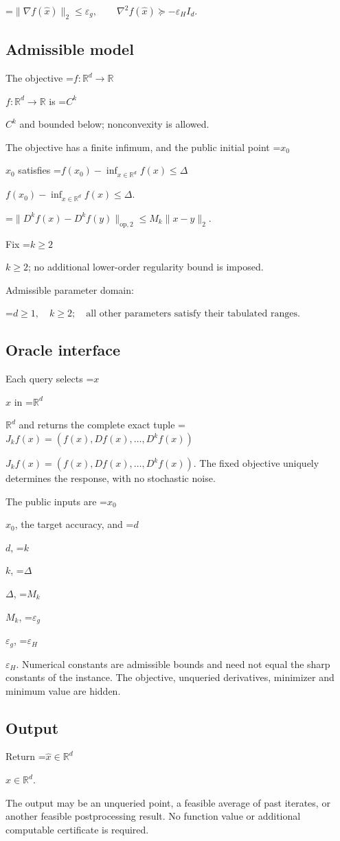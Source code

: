 \documentclass[10pt,a4paper]{article}
\newcommand{\AtlasMath}[1]{\par\begingroup\centering\setbox0=\hbox{$\displaystyle #1$}\ifdim\wd0>1.4\linewidth\typeout{ATLAS WIDE FORMULA: \the\wd0}\fi\ifdim\wd0>\linewidth\resizebox{\linewidth}{!}{\box0}\else\box0\fi\par\endgroup}
\newcommand{\AtlasInlineMath}[1]{\begingroup\setbox0=\hbox{$#1$}\ifdim\wd0>.4\linewidth\endgroup\AtlasMath{#1}\else\endgroup$#1$\fi}
\begin{document}
\AtlasMath{\|\nabla f(\widehat{x})\|_2\le\varepsilon_g,\qquad\nabla^2f(\widehat{x})\succeq-\varepsilon_H I_d.}


\subsection{Admissible model}
The objective \AtlasInlineMath{f:\mathbb{R}^d\to\mathbb{R}} is \AtlasInlineMath{C^k} and bounded below; nonconvexity is allowed.

The objective has a finite infimum, and the public initial point \AtlasInlineMath{x_0} satisfies \AtlasInlineMath{f(x_0)-\inf_{x\in \mathbb{R}^d}f(x)\le\Delta}.


\AtlasMath{\|D^{k}f(x)-D^{k}f(y)\|_{\mathrm{op},2}\le M_k\|x-y\|_{2}.}


Fix \AtlasInlineMath{k\ge2}; no additional lower-order regularity bound is imposed.

Admissible parameter domain:


\AtlasMath{d\ge1,\quad k\ge2;\quad\text{all other parameters satisfy their tabulated ranges}.}


\subsection{Oracle interface}
Each query selects \AtlasInlineMath{x} in \AtlasInlineMath{\mathbb{R}^d} and returns the complete exact tuple \AtlasInlineMath{J_{k}f(x)=(f(x),Df(x),\ldots,D^{k}f(x))}. The fixed objective uniquely determines the response, with no stochastic noise.

The public inputs are \AtlasInlineMath{x_0}, the target accuracy, and \AtlasInlineMath{d}, \AtlasInlineMath{k}, \AtlasInlineMath{\Delta}, \AtlasInlineMath{M_k}, \AtlasInlineMath{\varepsilon_g}, \AtlasInlineMath{\varepsilon_H}. Numerical constants are admissible bounds and need not equal the sharp constants of the instance. The objective, unqueried derivatives, minimizer and minimum value are hidden.

\subsection{Output}
Return \AtlasInlineMath{\widehat{x}\in \mathbb{R}^d}.

The output may be an unqueried point, a feasible average of past iterates, or another feasible postprocessing result. No function value or additional computable certificate is required.
\end{document}

